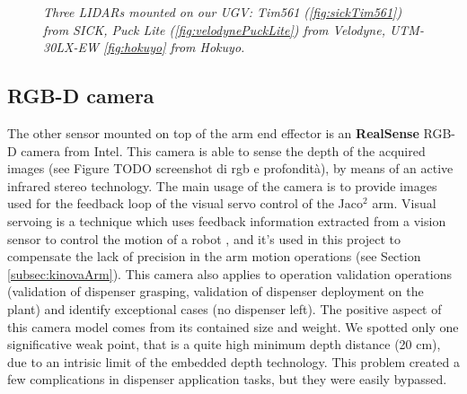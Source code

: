 \begin{figure}
	\centering
	\caption{\textit{Three \ac{LIDAR}s mounted on our \ac{UGV}: Tim561 (\ref{fig:sickTim561}) from SICK, Puck Lite (\ref{fig:velodynePuckLite}) from Velodyne, UTM-30LX-EW \ref{fig:hokuyo} from Hokuyo.}}
\end{figure}

\subsection{RGB-D camera}
The other sensor mounted on top of the arm end effector is an \textbf{RealSense} RGB-D camera from Intel. This camera is able to sense the depth of the acquired images (see Figure TODO screenshot di rgb e profondità), by means of an active infrared stereo technology. The main usage of the camera is to provide images used for the feedback loop of the visual servo control of the Jaco$^2$ arm. Visual servoing is a technique which uses feedback information extracted from a vision sensor to control the motion of a robot \parencite{visualServo}, and it's used in this project to compensate the lack of precision in the arm motion operations (see Section \ref{subsec:kinovaArm}). This camera also applies to operation validation operations (validation of dispenser grasping, validation of dispenser deployment on the plant) and identify exceptional cases (no dispenser left). The positive aspect of this camera model comes from its contained size and weight. We spotted only one significative weak point, that is a quite high minimum depth distance (20 cm), due to an intrisic limit of the embedded depth technology. This problem created a few complications in dispenser application tasks, but they were easily bypassed.

